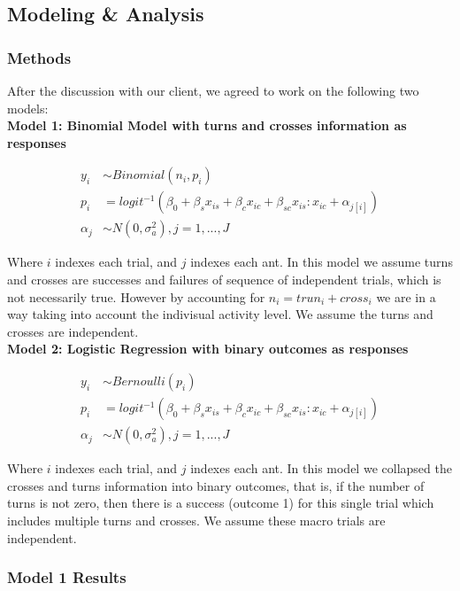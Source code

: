 \documentclass{article}
\begin{document}
	

	\subsection{Modeling \& Analysis}
	\subsubsection{Methods}
	After the discussion with our client, we agreed to work on the following two models: \\
	
	\noindent\textbf{Model 1: Binomial Model with turns and crosses information as responses}  

	\begin{align*}
	y_i &\sim Binomial(n_i,p_i)\\
	p_i &= logit^{-1}(\beta_0 + \beta_sx_{is} + \beta_cx_{ic} + \beta_{sc}x_{is}:x_{ic} + \alpha_{j[i]})\\
	\alpha_j &\sim N(0, \sigma^2_a),j=1,...,J
	\end{align*}
	
	Where $i$ indexes each trial, and $j$ indexes each ant. In this model we assume turns and crosses are successes and failures of sequence of independent trials, which is not necessarily true. However by accounting for $n_i = trun_i + cross_i$ we are in a way taking into account the indivisual activity level. We assume the turns and crosses are independent.  \\
	
	\noindent\textbf{Model 2: Logistic Regression with binary outcomes as responses}  
	
	\begin{align*}
	y_i &\sim Bernoulli(p_i)\\
	p_i &= logit^{-1}(\beta_0 + \beta_sx_{is} + \beta_cx_{ic} + \beta_{sc}x_{is}:x_{ic} + \alpha_{j[i]})\\
	\alpha_j &\sim N(0, \sigma^2_a),j=1,...,J
	\end{align*}  
	
	Where $i$ indexes each trial, and $j$ indexes each ant. In this model we collapsed the crosses and turns information into binary outcomes, that is, if the number of turns is not zero, then there is a success (outcome 1) for this single trial which includes multiple turns and crosses. We assume these macro trials are independent.

	\subsubsection{Model 1 Results}
\end{document}
